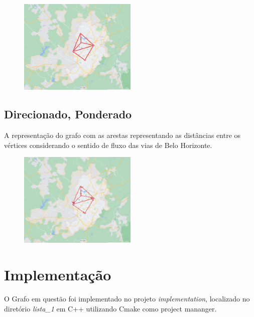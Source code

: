 \documentclass[12pt]{article}
\begin{document}
\begin{center}
    \begin{figure}[h!]
        \centering
        \includegraphics[trim={10cm 7cm 7cm 7cm},clip, width=0.5\textwidth]{imagens/grafos5.jpeg}
    \end{figure}
\end{center}

\subsection{Direcionado, Ponderado}
A representação do grafo com as arestas representando as distâncias entre os vértices considerando o sentido de fluxo das vias de Belo Horizonte.

\begin{center}
    \begin{figure}[h]
        \centering
        \includegraphics[trim={10cm 7cm 7cm 7cm},clip, width=0.5\textwidth]{imagens/grafos3.jpeg}
    \end{figure}
\end{center}

\section{Implementação}
O Grafo em questão foi implementado no projeto \textit{implementation}, localizado no diretório \textit{lista\_1} em C++ utilizando Cmake como project mananger.
\end{document}
